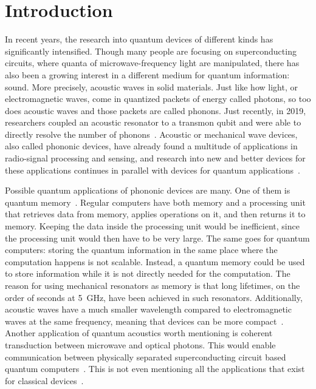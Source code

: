 \chapter{Introduction}

In recent years, the research into quantum devices of different kinds has
significantly intensified.
Though many people are focusing on superconducting circuits, where quanta of
microwave-frequency light are manipulated, there has also been
a growing interest in a different medium for quantum information: sound.
More precisely, acoustic waves in solid materials.
Just like how light, or electromagnetic waves, come in quantized packets of energy called
photons,
so too does acoustic waves and those packets are called phonons.
Just recently, in 2019, researchers coupled an acoustic resonator to a transmon
qubit and were able to directly resolve the number of phonons~\cite{arrangoiz-arriola_resolving_2019}.
Acoustic or mechanical wave devices, also called phononic devices, have already
found a multitude of applications in radio-signal processing and sensing, and
research into new and better devices for these applications continues in
parallel with devices for quantum applications~\cite{laer_controlling_2019}.

Possible quantum applications of phononic devices are many.
One of them is quantum memory~\cite{sete_high-efficiency_2015}.
Regular computers have both memory and a processing unit that
retrieves data from memory, applies operations on it, and then returns it to
memory.
Keeping the data inside the processing unit would be inefficient,
since the processing unit would then have to be very large.
The same goes for quantum computers: storing the quantum information in
the same place where the computation happens is not scalable.
Instead, a quantum memory could be used to store information while it is not
directly needed for the computation.
The reason for using mechanical resonators as memory is that long lifetimes, on
the order of seconds at \qty{5}{\giga\hertz}, have been achieved in such
resonators.
Additionally, acoustic waves have a much smaller wavelength compared to
electromagnetic waves at the same frequency, meaning that devices can be more
compact~\cite{maccabe_phononic_2020}.
Another application of quantum acoustics worth mentioning is
coherent transduction between microwave and optical photons.
This would enable communication between physically separated superconducting
circuit based quantum computers~\cite{laer_controlling_2019}.
This is not even mentioning all the applications that exist for classical
devices~\cite{laer_controlling_2019}.

